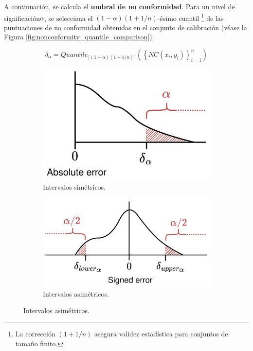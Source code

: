 \begin{enumerate}
    A continuación, se calcula el \textbf{umbral de no conformidad}. Para un nivel de significación$\alpha$, se selecciona el $(1 - \alpha)(1 + 1/n)$-ésimo cuantil%
    \footnote{
        La corrección $(1 + 1/n)$ asegura validez estadística para conjuntos de tamaño finito.
    } 
    de las puntuaciones de no conformidad obtenidas en el conjunto de calibración (véase la Figura \ref{fig:nonconformity_quantile_comparison}).

    $$
    \delta_\alpha = Quantile_{ \lceil  (1-\alpha) (1 + 1/n)  \rceil } ( \left\{ NC(x_i,y_i) \right\}_{i=1}^n )
    $$

    \begin{figure}[htbp]
        \centering

        \begin{subfigure}[b]{0.48\textwidth}
            \centering
            \includegraphics[width=\textwidth]{capitulos/cap_02/imagenes/nonconformity_quantile_threshold_simetric.png}
            \caption{Intervalos simétricos.}
            \label{fig:nonconformity_quantile_threshold_simetric}
        \end{subfigure}
        \hfill
        \begin{subfigure}[b]{0.49\textwidth}
            \centering
            \includegraphics[width=\textwidth]{capitulos/cap_02/imagenes/nonconformity_quantile_threshold_asimetric.png}
            \caption{Intervalos asimétricos.}
            \label{fig:nonconformity_quantile_threshold_asimetric}
        \end{subfigure}


\end{figure}
\end{enumerate}
